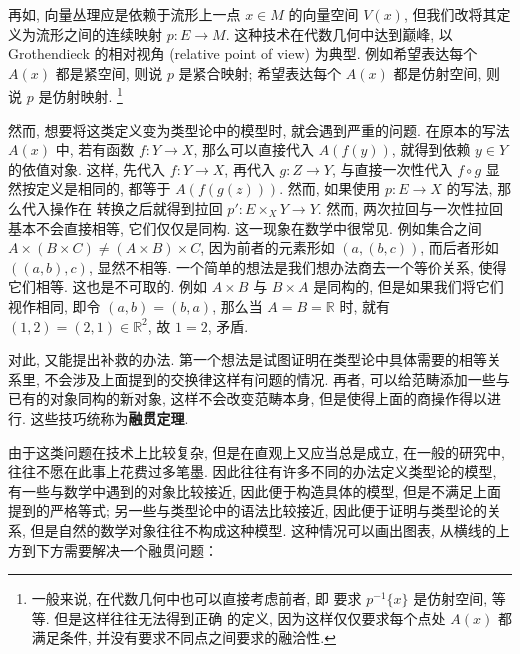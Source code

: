 再如, 向量丛理应是依赖于流形上一点 \(x \in M\) 的向量空间 \(V(x)\),
但我们改将其定义为流形之间的连续映射 \(p : E \to M\).
这种技术在代数几何中达到巅峰, 以 Grothendieck 的相对视角
(relative point of view) 为典型.
例如希望表达每个 \(A(x)\) 都是紧空间, 则说 \(p\) 是紧合映射;
希望表达每个 \(A(x)\) 都是仿射空间, 则说 \(p\) 是仿射映射.%
\footnote{一般来说, 在代数几何中也可以直接考虑前者, 即
要求 \(p^{-1}\{x\}\) 是仿射空间, 等等. 但是这样往往无法得到正确
的定义, 因为这样仅仅要求每个点处 \(A(x)\) 都满足条件,
并没有要求不同点之间要求的融洽性.}

然而, 想要将这类定义变为类型论中的模型时, 就会遇到严重的问题.
在原本的写法 \(A(x)\) 中, 若有函数 \(f : Y \to X\),
那么可以直接代入 \(A(f(y))\), 就得到依赖 \(y \in Y\) 的依值对象.
这样, 先代入 \(f : Y \to X\), 再代入 \(g : Z \to Y\),
与直接一次性代入 \(f \circ g\) 显然按定义是相同的,
都等于 \(A(f(g(z)))\).
然而, 如果使用 \(p : E \to X\) 的写法, 那么代入操作在
转换之后就得到拉回 \(p' : E \times_X Y \to Y\).
然而, 两次拉回与一次性拉回基本不会直接相等, 它们仅仅是同构.
这一现象在数学中很常见. 例如集合之间
\(A \times (B \times C) \ne (A \times B) \times C\),
因为前者的元素形如 \((a, (b, c))\), 而后者形如
\(((a, b), c)\), 显然不相等.
一个简单的想法是我们想办法商去一个等价关系, 使得它们相等.
这也是不可取的. 例如 \(A \times B\) 与 \(B \times A\) 是同构的,
但是如果我们将它们视作相同, 即令 \((a, b) = (b, a)\),
那么当 \(A = B = \mathbb{R}\) 时,
就有 \((1, 2) = (2, 1) \in \mathbb{R}^2\), 故 \(1 = 2\), 矛盾.

对此, 又能提出补救的办法.
第一个想法是试图证明在类型论中具体需要的相等关系里,
不会涉及上面提到的交换律这样有问题的情况.
再者, 可以给范畴添加一些与已有的对象同构的新对象,
这样不会改变范畴本身, 但是使得上面的商操作得以进行.
这些技巧统称为\textbf{融贯定理}.

由于这类问题在技术上比较复杂, 但是在直观上又应当总是成立,
在一般的研究中, 往往不愿在此事上花费过多笔墨.
因此往往有许多不同的办法定义类型论的模型,
有一些与数学中遇到的对象比较接近, 因此便于构造具体的模型,
但是不满足上面提到的严格等式;
另一些与类型论中的语法比较接近, 因此便于证明与类型论的关系,
但是自然的数学对象往往不构成这种模型.
这种情况可以画出图表, 从横线的上方到下方需要解决一个融贯问题：

\begin{center}
\end{center}

